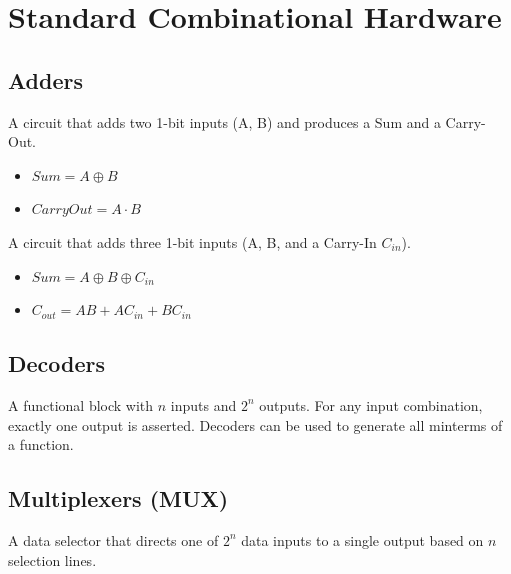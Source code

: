 \section{Standard Combinational Hardware}

\subsection{Adders}

\begin{definition}
A circuit that adds two 1-bit inputs (A, B) and produces a Sum and a Carry-Out.

\begin{itemize}
    \item $Sum = A \oplus B$
    \item $CarryOut = A \cdot B$
\end{itemize}

\end{definition}

\begin{definition}
A circuit that adds three 1-bit inputs (A, B, and a Carry-In $C_{in}$).

\begin{itemize}
    \item $Sum = A \oplus B \oplus C_{in}$
    \item $C_{out} = AB + AC_{in} + BC_{in}$
\end{itemize}

\end{definition}

\subsection{Decoders}

\begin{definition}[Decoder]
A functional block with $n$ inputs and $2^n$ outputs. For any input combination, exactly one output is asserted. Decoders can be used to generate all minterms of a function.
\end{definition}

\subsection{Multiplexers (MUX)}

\begin{definition}[Multiplexer]
A data selector that directs one of $2^n$ data inputs to a single output based on $n$ selection lines.
\end{definition}

